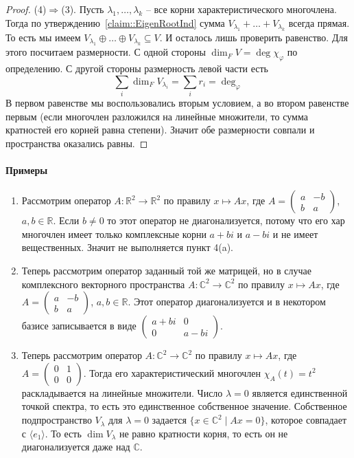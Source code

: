 \begin{proof}
(4)$\Rightarrow$(3). Пусть $\lambda_1,\ldots,\lambda_k$ -- все корни характеристического многочлена. Тогда по утверждению~\ref{claim::EigenRootInd} сумма $V_{\lambda_1}+\ldots +V_{\lambda_k}$ всегда прямая. То есть мы имеем $V_{\lambda_1}\oplus \ldots \oplus V_{\lambda_k}\subseteq V$. И осталось лишь проверить равенство. Для этого посчитаем размерности. С одной стороны $\dim_F V = \deg \chi_\varphi$ по определению. С другой стороны размерность левой части есть
\[
\sum_{i}\dim_F V_{\lambda_i} = \sum_i r_i = \deg_\varphi
\]
В первом равенстве мы воспользовались вторым условием, а во втором равенстве первым (если многочлен разложился на линейные множители, то сумма кратностей его корней равна степени). Значит обе размерности совпали и пространства оказались равны.
\end{proof}

\paragraph{Примеры}
\begin{enumerate}
\item Рассмотрим оператор $A\colon \mathbb R^2 \to \mathbb R^2$ по правилу $x\mapsto Ax$, где $A =\left( \begin{smallmatrix}{a}&{-b}\\{b}&{a}\end{smallmatrix}\right)$, $a, b\in\mathbb R$. Если $b\neq 0$ то этот оператор не диагонализуется, потому что его хар многочлен имеет только комплексные корни $a+bi$ и $a - bi$ и не имеет вещественных. Значит не выполняется пункт 4(a).

\item Теперь рассмотрим оператор заданный той же матрицей, но в случае комплексного векторного пространства $A\colon \mathbb C^2 \to \mathbb C^2$ по правилу $x\mapsto Ax$, где $A =\left( \begin{smallmatrix}{a}&{-b}\\{b}&{a}\end{smallmatrix}\right)$, $a, b\in\mathbb R$. Этот оператор диагонализуется и в некотором базисе записывается в виде $\left( \begin{smallmatrix}{a + bi}&{0}\\{0}&{a-bi}\end{smallmatrix}\right)$.

\item Теперь рассмотрим оператор $A\colon \mathbb C^2 \to \mathbb C^2$ по правилу $x\mapsto Ax$, где $A =\left( \begin{smallmatrix}{0}&{1}\\{0}&{0}\end{smallmatrix}\right)$. Тогда его характеристический многочлен $\chi_A(t) = t^2$ раскладывается на линейные множители. Число $\lambda = 0$ является единственной точкой спектра, то есть это единственное собственное значение. Собственное подпространство $V_\lambda$ для $\lambda = 0$ задается $\{x\in \mathbb C^2\mid Ax = 0\}$, которое совпадает с $\langle e_1 \rangle$. То есть $\dim V_\lambda$ не равно кратности корня, то есть он не диагонализуется даже над $\mathbb C$.
\end{enumerate}

